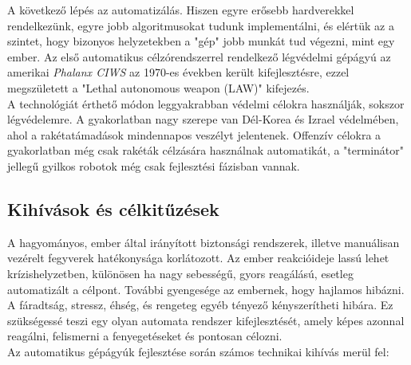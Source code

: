 \documentclass[12pt,a4paper]{article}
\begin{document}
A következő lépés az automatizálás. Hiszen egyre erősebb hardverekkel rendelkezünk, egyre jobb algoritmusokat tudunk implementálni, és elértük az a szintet, hogy bizonyos helyzetekben a "gép" jobb munkát tud végezni, mint egy ember. Az első automatikus célzórendszerrel rendelkező légvédelmi gépágyú az amerikai \textsl{Phalanx CIWS} az 1970-es években került kifejlesztésre, ezzel megszületett a "Lethal autonomous weapon (LAW)" kifejezés.\\

A technológiát érthető módon leggyakrabban védelmi célokra használják, sokszor légvédelemre. A gyakorlatban nagy szerepe van Dél-Korea és Izrael védelmében, ahol a rakétatámadások mindennapos veszélyt jelentenek. Offenzív célokra a gyakorlatban még csak rakéták célzására használnak automatikát, a "terminátor" jellegű gyilkos robotok még csak fejlesztési fázisban vannak.
\pagebreak 

\subsection{Kihívások és célkitűzések}

A hagyományos, ember által irányított biztonsági rendszerek, illetve manuálisan vezérelt fegyverek hatékonysága korlátozott. Az ember reakcióideje lassú lehet krízishelyzetben, különösen ha nagy sebességű, gyors reagálású, esetleg automatizált a célpont. További gyengesége az embernek, hogy hajlamos hibázni. A fáradtság, stressz, éhség, és rengeteg egyéb tényező kényszerítheti hibára. Ez szükségessé teszi egy olyan automata rendszer kifejlesztését, amely képes azonnal reagálni, felismerni a fenyegetéseket és pontosan célozni.\\

Az automatikus gépágyúk fejlesztése során számos technikai kihívás merül fel:
\end{document}
